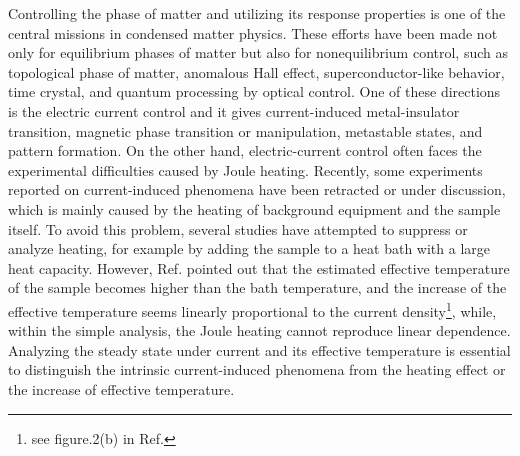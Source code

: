 \documentclass[a4paper, amsfonts, amssymb, amsmath, reprint, showkeys, nofootinbib, twoside,superscriptaddress, prl]{revtex4-2}
\begin{document}
Controlling the phase of matter and utilizing its response properties is one of the central missions in condensed matter physics. These efforts have been made not only for equilibrium phases of matter but also for nonequilibrium control, such as topological phase of matter\cite{Wang2013-rc, Wintersperger2020-gi}, anomalous Hall effect\cite{McIver2020-dy}, superconductor-like behavior\cite{Fausti2011-wl, Mitrano2016-pc, Liu2020-mx, Budden2021-wo, Buzzi2021-zm, Fava2024-pi}, time crystal\cite{Choi2017-ju, Zhang2017-dl, Liu2025-dg}, and quantum processing by optical control\cite{Tomita2017-oo, Noel2022-uq, Google-Quantum-AI-and-Collaborators2023-cr}. One of these directions is the electric current control and it gives current-induced metal-insulator transition\cite{Zhang2019-qb, Suen2024-id}, magnetic phase transition or manipulation\cite{Jain2006-om, Wadley2016-fj, Grzybowski2017-zi, Hrabec2017-as, Bodnar2018-sx, Arpaci2021-si, Reimers2023-kv, Zheng2024-in, Shimizu2025-fx}, metastable states\cite{Huber2025-ro}, and pattern formation\cite{Gauquelin2023-in}. 
On the other hand, electric-current control often faces the experimental difficulties caused by Joule heating. Recently, some experiments reported on current-induced phenomena have been retracted\cite{Sow2017-mw} or under discussion\cite{Kitaori2021-jc, Furuta2024-hy, Cao2025-uj, Zhang2025-vc}, which is mainly caused by the heating of background equipment and the sample itself. To avoid this problem, several studies have attempted to suppress or analyze heating\cite{Mattoni2020-bh, Zhang2019-qb, Curcio2023-rl, Mattoni2024-sh, Ootsuki2025-em, Fang2025-lh, Liu2026-us}, for example by adding the sample to a heat bath with a large heat capacity. However, Ref.\cite{Ootsuki2025-em} pointed out that the estimated effective temperature of the sample becomes higher than the bath temperature, and the increase of the effective temperature seems linearly proportional to the current density\footnote{see figure.2(b) in Ref.\cite{Ootsuki2025-em}}, while, within the simple analysis, the Joule heating cannot reproduce linear dependence\cite{Supple}. Analyzing the steady state under current and its effective temperature is essential to distinguish the intrinsic current-induced phenomena from the heating effect or the increase of effective temperature.
\end{document}
